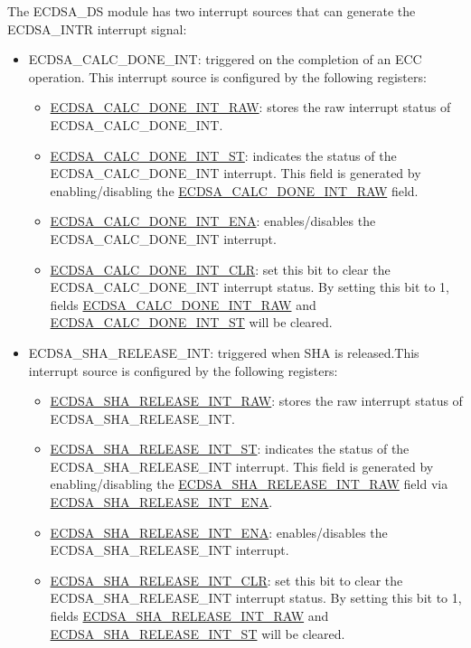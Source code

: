 \documentclass[main\_\_EN.tex]{subfiles}
\begin{document}
The ECDSA\_DS module has two interrupt sources that can generate the ECDSA\_INTR interrupt signal:
\begin{itemize}
	\item \label{int:ECDSACALCDONEINT}ECDSA\_CALC\_DONE\_INT: triggered on the completion of an ECC operation. This interrupt source is configured by the following registers:
	      \begin{itemize}
		      \item \hyperref[fielddesc:ECDSACALCDONEINTRAW]{ECDSA\_CALC\_DONE\_INT\_RAW}: stores the raw interrupt status of ECDSA\_CALC\_DONE\_INT.
		      \item \hyperref[fielddesc:ECDSACALCDONEINTST]{ECDSA\_CALC\_DONE\_INT\_ST}: indicates the status of the ECDSA\_CALC\_DONE\_INT interrupt. This field is generated by enabling/disabling the \hyperref[fielddesc:ECDSACALCDONEINTRAW]{ECDSA\_CALC\_DONE\_INT\_RAW} field.
		      \item \hyperref[fielddesc:ECDSACALCDONEINTENA]{ECDSA\_CALC\_DONE\_INT\_ENA}: enables/disables the ECDSA\_CALC\_DONE\_INT interrupt.
		      \item \hyperref[fielddesc:ECDSACALCDONEINTCLR]{ECDSA\_CALC\_DONE\_INT\_CLR}: set this bit to clear the ECDSA\_CALC\_DONE\_INT interrupt status. By setting this bit to 1, fields \hyperref[fielddesc:ECDSACALCDONEINTRAW]{ECDSA\_CALC\_DONE\_INT\_RAW} and  \hyperref[fielddesc:ECDSACALCDONEINTST]{ECDSA\_CALC\_DONE\_INT\_ST} will be cleared.
	      \end{itemize}
	\item \label{int:ECDSASHARELEASEINT}ECDSA\_SHA\_RELEASE\_INT: triggered when SHA is released.This interrupt source is configured by the following registers:
	      \begin{itemize}
		      \item \hyperref[fielddesc:ECDSASHARELEASEINTRAW]{ECDSA\_SHA\_RELEASE\_INT\_RAW}: stores the raw interrupt status of ECDSA\_SHA\_RELEASE\_INT.
		      \item \hyperref[fielddesc:ECDSASHARELEASEINTST]{ECDSA\_SHA\_RELEASE\_INT\_ST}: indicates the status of the ECDSA\_SHA\_RELEASE\_INT interrupt. This field is generated by enabling/disabling the \hyperref[fielddesc:ECDSASHARELEASEINTRAW]{ECDSA\_SHA\_RELEASE\_INT\_RAW} field via \hyperref[fielddesc:ECDSASHARELEASEINTENA]{ECDSA\_SHA\_RELEASE\_INT\_ENA}.
		      \item \hyperref[fielddesc:ECDSASHARELEASEINTENA]{ECDSA\_SHA\_RELEASE\_INT\_ENA}: enables/disables the ECDSA\_SHA\_RELEASE\_INT interrupt.
		      \item \hyperref[fielddesc:ECDSASHARELEASEINTCLR]{ECDSA\_SHA\_RELEASE\_INT\_CLR}: set this bit to clear the ECDSA\_SHA\_RELEASE\_INT interrupt status. By setting this bit to 1, fields \hyperref[fielddesc:ECDSASHARELEASEINTRAW]{ECDSA\_SHA\_RELEASE\_INT\_RAW} and  \hyperref[fielddesc:ECDSASHARELEASEINTST]{ECDSA\_SHA\_RELEASE\_INT\_ST} will be cleared.
	      \end{itemize}
\end{itemize}
\end{document}
